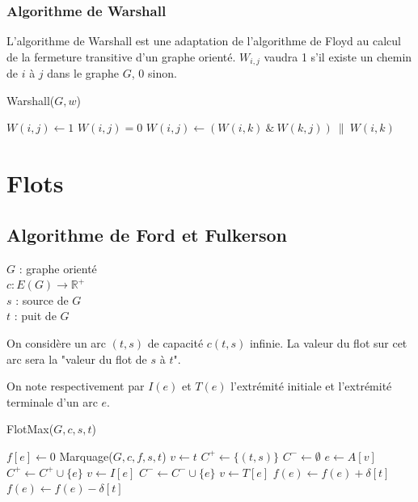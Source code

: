 \documentclass[11pt,a4paper]{report}
\begin{document}
\subsubsection{Algorithme de Warshall}

L'algorithme de Warshall est une adaptation de l'algorithme de Floyd au calcul de la fermeture transitive d'un graphe orienté. $W_{i,j}$ vaudra 1 s'il existe un chemin de $i$ à $j$ dans le graphe $G$, 0 sinon.

\begin{algorithm}
\caption{Warshall($G, w$)}
\begin{algorithmic}[1]
\STATE $W(i,j) \leftarrow 1$
\ELSE  
\STATE $W(i,j) = 0$
\ENDIF
\ENDFOR
\ENDFOR
{}
\STATE $W(i,j) \leftarrow (W(i,k) ~\& ~ W(k,j)) ~\| ~ W(i,k)$
\ENDFOR
\ENDFOR
\ENDFOR
\end{algorithmic}
\end{algorithm}


\newpage

\section{Flots}


\subsection{Algorithme de Ford et Fulkerson}

\noindent
$G$ : graphe orienté\\
$c: E(G) \rightarrow \mathbb{R^+}$ \\ 
$s$ : source de $G$\\
$t$ : puit de $G$

\noindent
On considère un arc $(t,s)$ de capacité $c(t,s)$ infinie. La valeur du flot sur cet arc sera la "valeur du flot de $s$ à $t$".

\noindent
On note respectivement par $I(e)$ et $T(e)$ l'extrémité initiale et l'extrémité terminale d'un arc $e$.

\begin{algorithm}
\caption{FlotMax($G, c, s, t$)}
\begin{algorithmic}[1]
\STATE $f[e] \leftarrow 0$
\ENDFOR
\REPEAT
\STATE Marquage($G, c, f, s, t$)
\STATE $v \leftarrow t$
\STATE $C^+ \leftarrow \{(t,s)\}$
\STATE $C^- \leftarrow \emptyset$
\STATE $e \leftarrow A[v]$
\STATE $C^+ \leftarrow C^+ \cup \{e\}$
\STATE $v \leftarrow I[e]$
\ELSE
\STATE $C^- \leftarrow C^- \cup \{e\}$
\STATE $v \leftarrow T[e]$
\ENDIF
\ENDWHILE
\ENDIF
{} 
\STATE $f(e) \leftarrow f(e) + \delta[t]$
\ENDFOR
{} 
\STATE $f(e) \leftarrow f(e) - \delta[t]$
\ENDFOR
{}
\end{algorithmic}
\end{algorithm}
\end{document}
